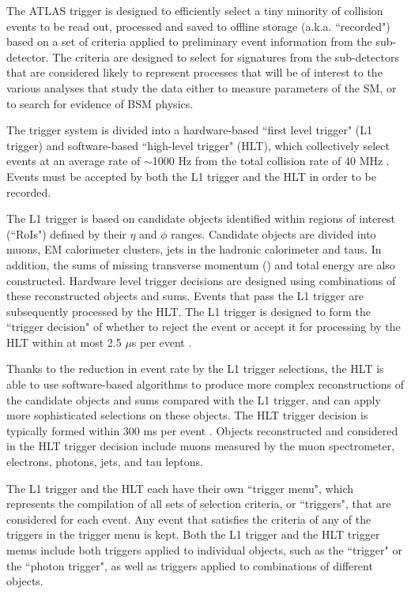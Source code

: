 The ATLAS trigger \cite{ATLAS_Trigger} is designed to efficiently select a tiny minority of collision events to be read out, processed and saved to offline storage (a.k.a. ``recorded") based on a set of criteria applied to preliminary event information from the sub-detector. The criteria are designed to select for signatures from the sub-detectors that are considered likely to represent processes that will be of interest to the various analyses that study the data either to measure parameters of the SM, or to search for evidence of BSM physics.

The trigger system is divided into a hardware-based ``first level trigger" (L1 trigger) and software-based ``high-level trigger" (HLT), which collectively select events at an average rate of \(\sim\)1000 Hz from the total collision rate of 40 MHz \cite{ATLAS_Trigger}. Events must be accepted by both the L1 trigger and the HLT in order to be recorded.

The L1 trigger is based on candidate objects identified within regions of interest (``RoIs") defined by their \(\eta\) and \(\phi\) ranges. Candidate objects are divided into muons, EM calorimeter clusters, jets in the hadronic calorimeter and taus. In addition, the sums of missing transverse momentum (\met) and total energy are also constructed. Hardware level trigger decisions are designed using combinations of these reconstructed objects and sums. Events that pass the L1 trigger are subsequently processed by the HLT. The L1 trigger is designed to form the ``trigger decision" of whether to reject the event or accept it for processing by the HLT within at most 2.5 \(\mu\)s per event \cite{ATLAS_Trigger}. 

Thanks to the reduction in event rate by the L1 trigger selections, the HLT is able to use software-based algorithms to produce more complex reconstructions of the candidate objects and sums compared with the L1 trigger, and can apply more sophisticated selections on these objects. The HLT trigger decision is typically formed within 300 ms per event \cite{ATLAS_Trigger}. Objects reconstructed and considered in the HLT trigger decision include muons measured by the muon spectrometer, electrons, photons, jets, \met and tau leptons. 

The L1 trigger and the HLT each have their own ``trigger menu", which represents the compilation of all sets of selection criteria, or ``triggers", that are considered for each event. Any event that satisfies the criteria of any of the triggers in the trigger menu is kept. Both the L1 trigger and the HLT trigger menus include both triggers applied to individual objects, such as the ``\met trigger" or the ``photon trigger", as well as triggers applied to combinations of different objects.

